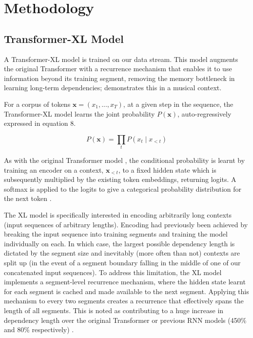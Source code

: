 \documentclass[sigconf]{nimeart}
\begin{document}
\section{Methodology}\label{methodology}

\subsection{Transformer-XL Model}\label{transformer-xl-model}

A Transformer-XL model is trained on our data stream. This model augments the original Transformer with a recurrence mechanism that enables it to use information beyond its training segment, removing the memory bottleneck in learning long-term dependencies; \cite{c8} demonstrates this in a musical context.

For a corpus of tokens $\textbf{x} = (x_1, ..., x_T)$, at a given step in the sequence, the Transformer-XL model learns the joint probability $P(\textbf{x})$, auto-regressively expressed in equation 8.


\begin{equation}P(\textbf{x}) = \prod_t P(x_t \mid x_{<t})\end{equation}


As with the original Transformer model \cite{c2}, the conditional probability is learnt by training an encoder on a context, $\textbf{x}_{<t}$, to a fixed hidden state which is subsequently multiplied by the existing token embeddings, returning logits. A softmax is applied to the logits to give a categorical probability distribution for the next token \cite{c29}.

The XL model is specifically interested in encoding arbitrarily long contexts (input sequences of arbitrary lengths). Encoding had previously been achieved by breaking the input sequence into training segments and training the model individually on each. In which case, the largest possible dependency length is dictated by the segment size and inevitably (more often than not) contexts are split up (in the event of a segment boundary falling in the middle of one of our concatenated input sequences). To address this limitation, the XL model implements a segment-level recurrence mechanism, where the hidden state learnt for each segment is cached and made available to the next segment. Applying this mechanism to every two segments creates a recurrence that effectively spans the length of all segments. This is noted as contributing to a huge increase in dependency length over the original Transformer or previous RNN models (450\% and 80\% respectively) \cite{c29}.
\end{document}
